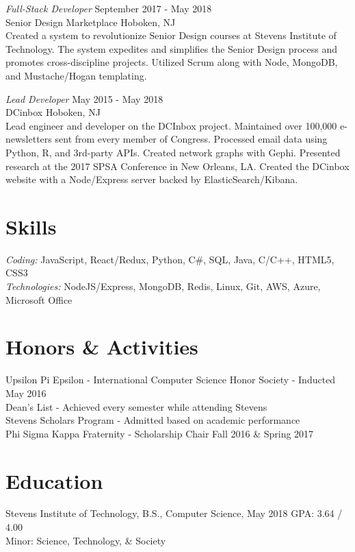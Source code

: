 \documentclass{res}
\begin{document}
{{\sl Full-Stack Developer} \hfill September 2017 - May 2018 \\
Senior Design Marketplace \hfill Hoboken, NJ \\
Created a system to revolutionize Senior Design courses at Stevens Institute of Technology. The system expedites and simplifies the Senior Design process and promotes cross-discipline projects. Utilized Scrum along with Node, MongoDB, and Mustache/Hogan templating.

{\sl Lead Developer} \hfill May 2015 - May 2018 \\
DCinbox \hfill Hoboken, NJ \\
Lead engineer and developer on the DCInbox project. Maintained over 100,000 e-newsletters sent from every member of Congress. Processed email data using Python, R, and 3rd-party APIs. Created network graphs with Gephi. Presented research at the 2017 SPSA Conference in New Orleans, LA. Created the DCinbox website with a Node/Express server backed by ElasticSearch/Kibana.

\section{\bf\large Skills}
{\sl Coding: } JavaScript, React/Redux, Python, C\#, SQL, Java, C/C++, HTML5, CSS3 \\
{\sl Technologies:} NodeJS/Express, MongoDB, Redis, Linux, Git, AWS, Azure, Microsoft Office

\section{\bf\large Honors \& Activities}
Upsilon Pi Epsilon - International Computer Science Honor Society - Inducted May 2016\\
Dean's List - Achieved every semester while attending Stevens \\
Stevens Scholars Program - Admitted based on academic performance \\
Phi Sigma Kappa Fraternity - Scholarship Chair Fall 2016 \& Spring 2017

\section{\bf\large Education}
Stevens Institute of Technology, B.S., Computer Science, May 2018 \hfill GPA: 3.64 / 4.00 \\
Minor: Science, Technology, \& Society \\

}
\end{document}
